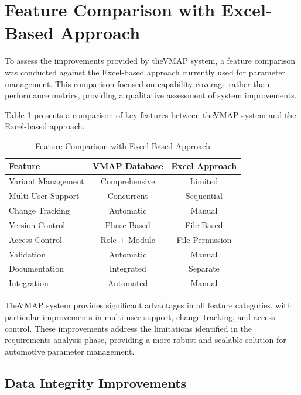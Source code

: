 \section{Feature Comparison with Excel-Based Approach}
\label{sec:feature-comparison-excel}

To assess the improvements provided by the\ac{VMAP} system, a feature comparison was conducted against the Excel-based approach currently used for parameter management. This comparison focused on capability coverage rather than performance metrics, providing a qualitative assessment of system improvements.

Table \ref{tab:feature-comparison} presents a comparison of key features between the\ac{VMAP} system and the Excel-based approach.

\begin{table}[h]
\centering
\caption{Feature Comparison with Excel-Based Approach}
\label{tab:feature-comparison}
\begin{tabular}{|l|c|c|}
\hline
\textbf{Feature} & \textbf{VMAP Database} & \textbf{Excel Approach} \\
\hline
Variant Management & Comprehensive & Limited \\
\hline
Multi-User Support & Concurrent & Sequential \\
\hline
Change Tracking & Automatic & Manual \\
\hline
Version Control & Phase-Based & File-Based \\
\hline
Access Control & Role + Module & File Permission \\
\hline
Validation & Automatic & Manual \\
\hline
Documentation & Integrated & Separate \\
\hline
Integration & Automated & Manual \\
\hline
\end{tabular}
\end{table}

The\ac{VMAP} system provides significant advantages in all feature categories, with particular improvements in multi-user support, change tracking, and access control. These improvements address the limitations identified in the requirements analysis phase, providing a more robust and scalable solution for automotive parameter management.

\subsection{Data Integrity Improvements}
\label{subsec:data-integrity-improvements}

